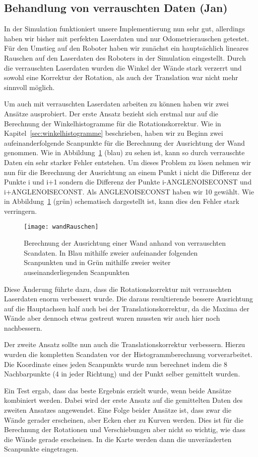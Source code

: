 \subsection{Behandlung von verrauschten Daten (Jan)}

In der Simulation funktioniert unsere Implementierung nun sehr gut, allerdings haben wir bisher mit perfekten Laserdaten und nur Odometrierauschen getestet. Für den Umstieg auf den Roboter haben wir zunächst ein hauptsächlich lineares Rauschen auf den Laserdaten des Roboters in der Simulation eingestellt. Durch die verrauschten Laserdaten wurden die Winkel der Wände stark verzerrt und sowohl eine Korrektur der Rotation, als auch der Translation war nicht mehr sinnvoll möglich.


Um auch mit verrauschten Laserdaten arbeiten zu können haben wir zwei Ansätze ausprobiert. Der erste Ansatz bezieht sich erstmal nur auf die Berechnung der Winkelhistogramme für die Rotationskorrektur. Wie in Kapitel~\ref{sec:winkelhistogramme} beschrieben, haben wir zu Beginn zwei aufeinanderfolgende Scanpunkte für die Berechnung der Ausrichtung der Wand genommen. Wie in Abbildung~\ref{fig:wandRauschen} (blau) zu sehen ist, kann so durch verrauschte Daten ein sehr starker Fehler entstehen. Um dieses Problem zu lösen nehmen wir nun für die Berechnung der Ausrichtung an einem Punkt i nicht die Differenz der Punkte i und i+1 sondern die Differenz der Punkte i-ANGLENOISECONST und i+ANGLENOISECONST. Als ANGLENOISECONST haben wir 10 gewählt. Wie in Abbildung~\ref{fig:wandRauschen} (grün) schematisch dargestellt ist, kann dies den Fehler stark verringern.

\begin{figure}
	\centering
	\texttt{[image: wandRauschen]}
	\caption{Berechnung der Ausrichtung einer Wand anhand von verrauschten Scandaten. In Blau mithilfe zweier aufeinander folgenden Scanpunkten und in Grün mithilfe zweier weiter auseinanderliegenden Scanpunkten}
	\label{fig:wandRauschen}
\end{figure}

Diese Änderung führte dazu, dass die Rotationskorrektur mit verrauschten Laserdaten enorm verbessert wurde. Die daraus resultierende bessere Ausrichtung auf die Hauptachsen half auch bei der Translationskorrektur, da die Maxima der Wände aber dennoch etwas gestreut waren mussten wir auch hier noch nachbessern.

Der zweite Ansatz sollte nun auch die Translationskorrektur verbessern. Hierzu wurden die kompletten Scandaten vor der Histogrammberechnung vorverarbeitet. Die Koordinate eines jeden Scanpunkts wurde nun berechnet indem die 8 Nachbarpunkte (4 in jeder Richtung) und der Punkt selber gemittelt wurden.

Ein Test ergab, dass das beste Ergebnis erzielt wurde, wenn beide Ansätze kombiniert werden. Dabei wird der erste Ansatz auf die gemittelten Daten des zweiten Ansatzes angewendet. Eine Folge beider Ansätze ist, dass zwar die Wände gerader erscheinen, aber Ecken eher zu Kurven werden. Dies ist für die Berechnung der Rotationen und Verschiebungen aber nicht so wichtig, wie dass die Wände gerade erscheinen. In die Karte werden dann die unveränderten Scanpunkte eingetragen.